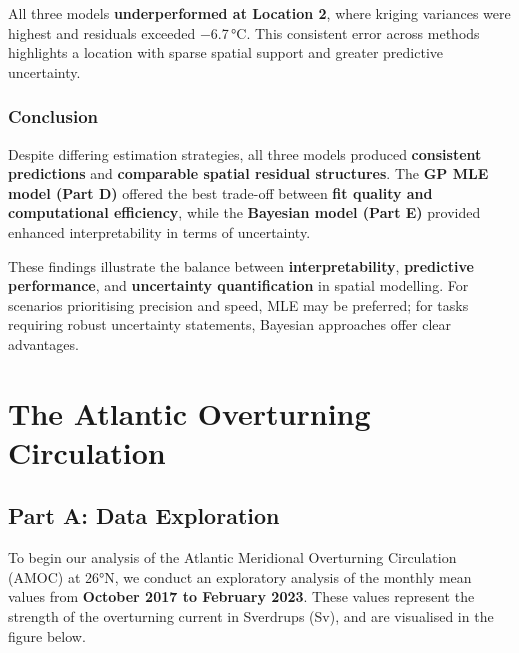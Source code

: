 \documentclass[
  11pt,
]{article}
\begin{document}
All three models \textbf{underperformed at Location 2}, where kriging
variances were highest and residuals exceeded −6.7\,°C. This consistent
error across methods highlights a location with sparse spatial support
and greater predictive uncertainty.

\subsubsection{\texorpdfstring{\textbf{Conclusion}}{Conclusion}}\label{conclusion-1}

Despite differing estimation strategies, all three models produced
\textbf{consistent predictions} and \textbf{comparable spatial residual
structures}. The \textbf{GP MLE model (Part D)} offered the best
trade-off between \textbf{fit quality and computational efficiency},
while the \textbf{Bayesian model (Part E)} provided enhanced
interpretability in terms of uncertainty.

These findings illustrate the balance between \textbf{interpretability},
\textbf{predictive performance}, and \textbf{uncertainty quantification}
in spatial modelling. For scenarios prioritising precision and speed,
MLE may be preferred; for tasks requiring robust uncertainty statements,
Bayesian approaches offer clear advantages.

\newpage

\section{The Atlantic Overturning
Circulation}\label{the-atlantic-overturning-circulation}

\subsection{Part A: Data Exploration}\label{part-a-data-exploration}

To begin our analysis of the Atlantic Meridional Overturning Circulation
(AMOC) at 26°N, we conduct an exploratory analysis of the monthly mean
values from \textbf{October 2017 to February 2023}. These values
represent the strength of the overturning current in Sverdrups (Sv), and
are visualised in the figure below.
\end{document}
